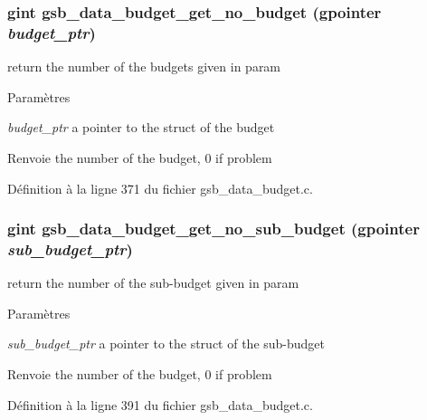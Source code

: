\subsubsection[{gsb\_\-data\_\-budget\_\-get\_\-no\_\-budget}]{\setlength{\rightskip}{0pt plus 5cm}gint gsb\_\-data\_\-budget\_\-get\_\-no\_\-budget (gpointer {\em budget\_\-ptr})}\label{gsb__data__budget_8c_ac49b01b1bea1214e11e6f4d917d2e96a}
return the number of the budgets given in param


\begin{DoxyParams}{Paramètres}
\item[{\em budget\_\-ptr}]a pointer to the struct of the budget\end{DoxyParams}
\begin{DoxyReturn}{Renvoie}
the number of the budget, 0 if problem 
\end{DoxyReturn}


Définition à la ligne 371 du fichier gsb\_\-data\_\-budget.c.

\subsubsection[{gsb\_\-data\_\-budget\_\-get\_\-no\_\-sub\_\-budget}]{\setlength{\rightskip}{0pt plus 5cm}gint gsb\_\-data\_\-budget\_\-get\_\-no\_\-sub\_\-budget (gpointer {\em sub\_\-budget\_\-ptr})}\label{gsb__data__budget_8c_ae9828f372bab1e58bba1fc7d99fef6ea}
return the number of the sub-\/budget given in param


\begin{DoxyParams}{Paramètres}
\item[{\em sub\_\-budget\_\-ptr}]a pointer to the struct of the sub-\/budget\end{DoxyParams}
\begin{DoxyReturn}{Renvoie}
the number of the budget, 0 if problem 
\end{DoxyReturn}


Définition à la ligne 391 du fichier gsb\_\-data\_\-budget.c.

